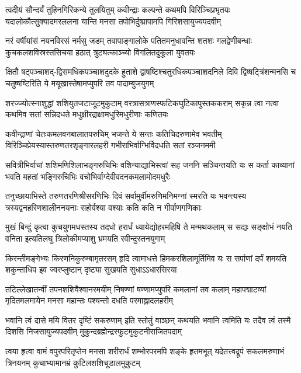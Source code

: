 \fourlineindentedshloka
{त्वदीयं सौन्दर्यं तुहिनगिरिकन्ये तुलयितुम्}
{कवीन्द्राः कल्पन्ते कथमपि विरिञ्चिप्रभृतयः}
{यदालोकौत्सुक्यादमरललना यान्ति मनसा}
{तपोभिर्दुष्प्रापामपि गिरिशसायुज्यपदवीम्}%

\fourlineindentedshloka
{नरं वर्षीयांसं नयनविरसं नर्मसु जडम्}
{तवापाङ्गालोके पतितमनुधावन्ति शतशः}
{गलद्वेणीबन्धाः कुचकलशविस्रस्तसिचया}
{हठात् त्रुट्यत्काञ्च्यो विगलितदुकूला युवतयः}%

\fourlineindentedshloka
{क्षितौ षट्पञ्चाशद्-द्विसमधिकपञ्चाशदुदके}
{हुताशे द्वाषष्टिश्चतुरधिकपञ्चाशदनिले}
{दिवि द्विष्षट्त्रिंशन्मनसि च चतुष्षष्टिरिति ये}
{मयूखास्तेषामप्युपरि तव पादाम्बुजयुगम्}%

\fourlineindentedshloka
{शरज्ज्योत्स्नाशुद्धां शशियुतजटाजूटमुकुटाम्}
{वरत्रासत्राणस्फटिकघुटिकापुस्तककराम्}
{सकृन्न त्वा नत्वा कथमिव सतां सन्निदधते}
{मधुक्षीरद्राक्षामधुरिमधुरीणाः कणितयः}%

\fourlineindentedshloka
{कवीन्द्राणां चेतःकमलवनबालातपरुचिम्}
{भजन्ते ये सन्तः कतिचिदरुणामेव भवतीम्}
{विरिञ्चिप्रेयस्यास्तरुणतरशृङ्गारलहरी}
{गभीराभिर्वाग्भिर्विदधति सतां रञ्जनममी}%

\fourlineindentedshloka
{सवित्रीभिर्वाचां शशिमणिशिलाभङ्गरुचिभिः}
{वशिन्याद्याभिस्त्वां सह जननि सञ्चिन्तयति यः}
{स कर्ता काव्यानां भवति महतां भङ्गिरुचिभिः}
{वचोभिर्वाग्देवीवदनकमलामोदमधुरैः}%

\fourlineindentedshloka
{तनुच्छायाभिस्ते तरुणतरणिश्रीसरणिभिः}
{दिवं सर्वामुर्वीमरुणिमनिमग्नां स्मरति यः}
{भवन्त्यस्य त्रस्यद्वनहरिणशालीननयनाः}
{सहोर्वश्या वश्याः कति कति न गीर्वाणगणिकाः}%

\fourlineindentedshloka
{मुखं बिन्दुं कृत्वा कुचयुगमधस्तस्य तदधो}
{हरार्धं ध्यायेद्योहरमहिषि ते मन्मथकलाम्}
{स सद्यः सङ्क्षोभं नयति वनिता इत्यतिलघु}
{त्रिलोकीमप्याशु भ्रमयति रवीन्दुस्तनयुगाम्}%

\fourlineindentedshloka
{किरन्तीमङ्गेभ्यः किरणनिकुरुम्बामृतरसम्}
{हृदि त्वामाधत्ते हिमकरशिलामूर्तिमिव यः}
{स सर्पाणां दर्पं शमयति शकुन्ताधिप इव}
{ज्वरप्लुष्टान् दृष्ट्या सुखयति सुधाऽऽधारसिरया}%

\fourlineindentedshloka
{तटिल्लेखातन्वीं तपनशशिवैश्वानरमयीम्}
{निषण्णां षण्णामप्युपरि कमलानां तव कलाम्}
{महापद्माटव्यां मृदितमलमायेन मनसा}
{महान्तः पश्यन्तो दधति परमाह्लादलहरीम्}%

\fourlineindentedshloka
{भवानि त्वं दासे मयि वितर दृष्टिं सकरुणाम्}
{इति स्तोतुं वाञ्छन् कथयति भवानि त्वमिति यः}
{तदैव त्वं तस्मै दिशसि निजसायुज्यपदवीम्}
{मुकुन्दब्रह्मेन्द्रस्फुटमुकुटनीराजितपदाम्}%

\fourlineindentedshloka
{त्वया हृत्वा वामं वपुरपरितृप्तेन मनसा}
{शरीरार्धं शम्भोरपरमपि शङ्के हृतमभूत्}
{यदेतत्त्वद्रूपं सकलमरुणाभं त्रिनयनम्}
{कुचाभ्यामानम्रं कुटिलशशिचूडालमुकुटम्}%

